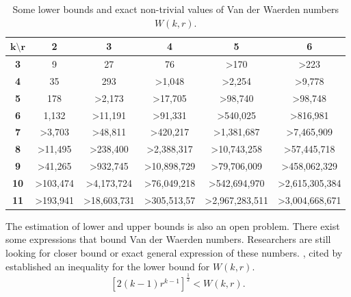 \begin{table}[h]
\begin{tabular}{|c||c|c|c|c|c|}
\hline 
$\mathbf{k \setminus r}$ & \textbf{ 2 }& \textbf{3} & \textbf{4} & \textbf{5} & \textbf{6} \\ 
\hline  \hline
\textbf{3}  &	9	& 27 &	76 &	 \textgreater  170 &	  \textgreater  223 \\ \hline 
\textbf{4}	& 35 &	293  &	 \textgreater 1,048 &	 \textgreater 2,254 &	 \textgreater  9,778 \\ \hline 
\textbf{5}	& 178	& \textgreater 2,173 &	 \textgreater 17,705 &	 \textgreater 98,740 &	 \textgreater 98,748 \\ \hline 
\textbf{6}	& 1,132 &	 \textgreater 11,191 & \textgreater 91,331 &	 \textgreater 540,025 &	 \textgreater  816,981 \\ \hline 
\textbf{7}	&  \textgreater 3,703 &	 \textgreater  48,811 &	 \textgreater 420,217 &	 \textgreater 1,381,687 &	 \textgreater 7,465,909 \\ \hline 
\textbf{8}	&  \textgreater 11,495 &	 \textgreater 238,400 &	 \textgreater 2,388,317&	 \textgreater 10,743,258&	 \textgreater 57,445,718\\ \hline 
\textbf{9}	&  \textgreater 41,265 &	 \textgreater 932,745&	 \textgreater 10,898,729&	 \textgreater 79,706,009&	 \textgreater 458,062,329 \\ \hline 
\textbf{10}	 &  \textgreater 103,474&	 \textgreater 4,173,724&	 \textgreater 76,049,218&	 \textgreater 542,694,970 &	 \textgreater 2,615,305,384 \\ \hline 
\textbf{11}	&  \textgreater 193,941&	 \textgreater 18,603,731&	 \textgreater 305,513,57 &	 \textgreater 2,967,283,511 &	 \textgreater 3,004,668,671 \\ \hline 
\end{tabular} 

\caption{Some lower bounds and exact non-trivial values of Van der Waerden numbers $W(k,r).$} \label{vdw1}
\end{table}

The estimation of lower and upper bounds is also an open problem. There exist some expressions that bound Van der Waerden numbers.  Researchers are still looking for closer bound or exact general expression of these numbers.
 \cite{erdos1952combinatorial}, cited by \cite{dransfield2004} established an inequality for the lower bound for $W(k,r).$
\begin{equation}
\left[2(k-1) r^{k-1} \right]^{\frac{1}{2}} < W(k,r). \label{erdos}
\end{equation}

